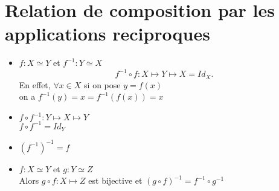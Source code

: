 \documentclass[../main.tex]{subfiles}
\begin{document}
\section{Relation de composition par les applications reciproques}

\begin{itemize}
	\item$f: X \simeq Y$ et  $ f^{-1}: Y \simeq X$ \\
\[ 
	f^{-1} \circ f: X \mapsto Y \mapsto X = Id_{X}.
\]
En effet, $\forall x \in X$ si on pose $y = f(x)$ \\
on a $f^{-1} ( y) = x = f^{-1}(f(x)) = x$
\item $f \circ f^{-1}: Y \mapsto X \mapsto Y$ \\
	$f\circ f^{-1} = Id_Y$ \\
\item $ ( f^{-1})^{-1} =f$ 
\item $f: X \simeq Y$ et $g: Y \simeq Z$ \\
	Alors $g\circ f: X \mapsto Z$ est bijective et $ ( g\circ f)^{-1} = f^{-1} \circ g^{-1}$
\end{itemize}
\end{document}
